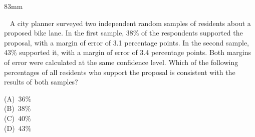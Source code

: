 \documentclass[a4paper]{article}
\newcommand{\COLW}{83mm}
\newcommand{\pnum}[1]{\fcolorbox{ink}{white}{\sffamily\bfseries\fontsize{8}{8}\selectfont #1}~}
\begin{document}
\begin{textblock*}{\COLW}
{{\noindent\pnum{15} A city planner surveyed two independent random samples of residents about a proposed bike lane. In the first sample, 38\% of the respondents supported the proposal, with a margin of error of 3.1 percentage points. In the second sample, 43\% supported it, with a margin of error of 3.4 percentage points. Both margins of error were calculated at the same confidence level. Which of the following percentages of all residents who support the proposal is consistent with the results of both samples?\par\vspace{2.2mm}
\hspace*{7mm}(A)\ $36\%$\\[1.8mm]
\hspace*{7mm}(B)\ $38\%$\\[1.8mm]
\hspace*{7mm}(C)\ $40\%$\\[1.8mm]
\hspace*{7mm}(D)\ $43\%$
\vfill}}
\end{textblock*}
\clearpage
\end{document}
